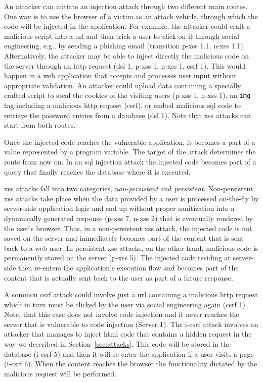 \documentclass[conference]{IEEEtran}
\begin{document}
An attacker can initiate an injection attack through two different main routes.
One way is to use the browser of a victim as an attack
vehicle, through which the code will be injected in the application.
For example, the attacker could craft a malicious script into a {\sc
  url} and then trick a user to click on it through social
engineering, e.g., by sending a phishing email (transition {\sc p-xss} 1.1, {\sc
  n-xss} 1.1). Alternatively, the attacker may be able
to inject directly the malicious code on the server through an {\sc http} request
({\sc dsl} 1, {\sc p-xss} 1, {\sc n-xss} 1, {\sc csrf} 1). This would happen
in a web application that accepts and processes user input
without appropriate validation. An attacker could upload data
containing a specially crafted script
to steal the cookies of the visiting users ({\sc p-xss} 1, {\sc n-xss} 1),
an {\tt img} tag including a malicious {\sc http} request ({\sc csrf}),
or embed malicious
{\sc sql} code to retrieve the password entries from a database ({\sc dsl} 1).
Note that {\sc xss} attacks can start from both routes.

Once the injected code reaches the vulnerable application, it becomes
a part of a value represented by a program variable. The target of the
attack determines the route from now on. In an {\sc sql} injection
attack the injected code becomes part of a query that
finally reaches the database where it is executed.

{\sc xss} attacks fall into two categories, {\it non-persistent} and
{\it persistent}. Non-persistent {\sc xss} attacks take place when the
data provided by a user is processed on-the-fly
by server-side application logic and end up without proper sanitization
into a dynamically generated response ({\sc p-xss} 7, {\sc n-xss} 2)
that is eventually rendered by the user's browser.
Thus, in a non-persistent {\sc xss} attack, the injected code
is not saved on the server and immediately becomes part of the
content that is sent back to a web user.
In persistent {\sc xss} attacks, on the other hand,
malicious code is permanently stored on the server ({\sc p-xss} 5).
The injected code residing at server-side then re-enters the
application's execution flow and becomes part of the content that is
actually sent back to the user as part of a future response.

A common {\sc csrf} attack could involve just a
{\sc url} containing a malicious {\sc http} request
which in turn must be clicked by the user
via social engineering again ({\sc csrf} 1).
Note, that this case does not involve code injection
and it never reaches the server that is vulnerable
to code injection (Server 1).
The {\sc i-csrf} attack involves an attacker
that manages to inject {\sc html} code that contains
a hidden request in the way we described in
Section~\ref{sec:attacks}. This code will be stored
in the database ({\sc i-csrf} 5)
and then it will re-enter the application if
a user visits a page ({\sc i-csrf} 6). When the
content reaches the browser the functionality
dictated by the malicious request will be performed. 
\end{document}
